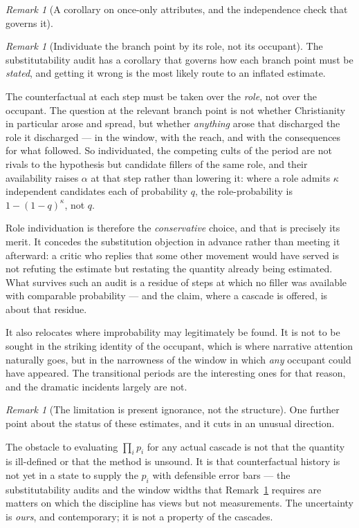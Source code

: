 \documentclass[11pt]{article}
\numberwithin{equation}{section}
\theoremstyle{plain}
\theoremstyle{definition}
\theoremstyle{remark}
\newtheorem{remark}[theorem]{Remark}
\begin{document}
\begin{remark}[A corollary on once-only attributes, and the independence
check that governs it]
\begin{remark}[Individuate the branch point by its role, not its
occupant]\label{gc:rem:roleindividuation}
The substitutability audit has a corollary that governs how each branch
point must be \emph{stated}, and getting it wrong is the most likely
route to an inflated estimate.

The counterfactual at each step must be taken over the \emph{role}, not
over the occupant. The question at the relevant branch point is not
whether Christianity in particular arose and spread, but whether
\emph{anything} arose that discharged the role it discharged --- in the
window, with the reach, and with the consequences for what followed. So
individuated, the competing cults of the period are not rivals to the
hypothesis but candidate fillers of the same role, and their availability
raises $\alpha$ at that step rather than lowering it: where a role admits
$\kappa$ independent candidates each of probability $q$, the
role-probability is $1-(1-q)^{\kappa}$, not $q$.

Role individuation is therefore the \emph{conservative} choice, and that
is precisely its merit. It concedes the substitution objection in
advance rather than meeting it afterward: a critic who replies that some
other movement would have served is not refuting the estimate but
restating the quantity already being estimated. What survives such an
audit is a residue of steps at which no filler was available with
comparable probability --- and the claim, where a cascade is offered, is
about that residue.

It also relocates where improbability may legitimately be found. It is
not to be sought in the striking identity of the occupant, which is
where narrative attention naturally goes, but in the narrowness of the
window in which \emph{any} occupant could have appeared. The
transitional periods are the interesting ones for that reason, and the
dramatic incidents largely are not.
\end{remark}

\begin{remark}[The limitation is present ignorance, not the structure]
\label{gc:rem:measurement}
One further point about the status of these estimates, and it
cuts in an unusual direction.

The obstacle to evaluating $\prod_i p_i$ for any actual cascade is not
that the quantity is ill-defined or that the method is unsound. It is
that counterfactual history is not yet in a state to supply the
$p_i$ with defensible error bars --- the substitutability audits and the
window widths that Remark~\ref{gc:rem:roleindividuation} requires are
matters on which the discipline has views but not measurements. The
uncertainty is \emph{ours}, and contemporary; it is not a property of
the cascades.


\end{remark}
\end{remark}
\end{document}
